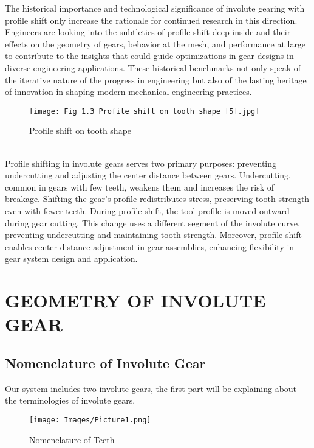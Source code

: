 \documentclass{article}
\begin{document}
The historical importance and technological significance of involute gearing with profile shift only increase the rationale for continued research in this direction. Engineers are looking into the subtleties of profile shift deep inside and their effects on the geometry of gears, behavior at the mesh, and performance at large to contribute to the insights that could guide optimizations in gear designs in diverse engineering applications. These historical benchmarks not only speak of the iterative nature of the progress in engineering but also of the lasting heritage of innovation in shaping modern mechanical engineering practices.
\begin{figure}
    \centering
    \texttt{[image: Fig 1.3 Profile shift on tooth shape [5].jpg]}
    \caption{ Profile shift on tooth shape \cite{Profileshift-of-Involute-Gears5}}
    \label{fig:enter-label}
\end{figure}\\
Profile shifting in involute gears serves two primary purposes: preventing undercutting and adjusting the center distance between gears. Undercutting, common in gears with few teeth, weakens them and increases the risk of breakage. Shifting the gear's profile redistributes stress, preserving tooth strength even with fewer teeth.
During profile shift, the tool profile is moved outward during gear cutting. This change uses a different segment of the involute curve, preventing undercutting and maintaining tooth strength. Moreover, profile shift enables center distance adjustment in gear assemblies, enhancing flexibility in gear system design and application.

\newpage
\section{GEOMETRY OF INVOLUTE GEAR}
\subsection{Nomenclature of Involute Gear}

Our system includes two involute gears, the first part will be explaining about the terminologies of involute gears.


   \begin{figure}[h]
       \centering
       \texttt{[image: Images/Picture1.png]}
       \caption{ Nomenclature of Teeth \cite{GearTerminology8}}
       \label{ Nomenclature of Teeth}
   \end{figure}
\end{document}
